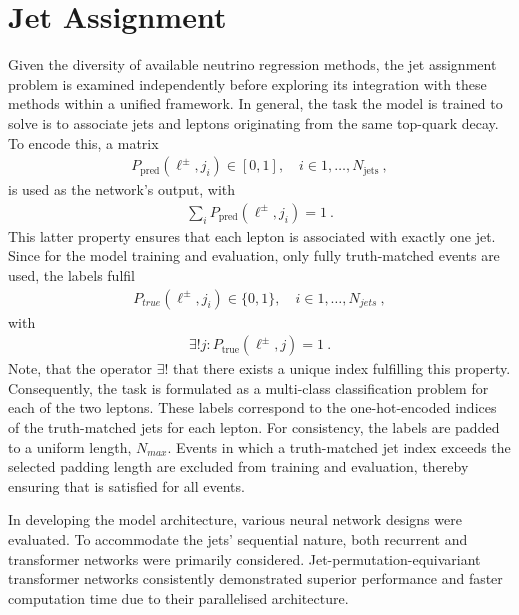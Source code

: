 \section{Jet Assignment}
\label{sec:jet assignment}
Given the diversity of available neutrino regression methods, the jet assignment problem is examined independently before exploring its integration with these methods within a unified framework.
In general, the task the model is trained to solve is to associate jets and leptons originating from the same top-quark decay. To encode this, a matrix 
\begin{align}
    P_{\text{pred}}(\ell^{\pm},j_i)\in[0,1],\quad i\in{1,\ldots, N_{\text{jets}}}~,
\end{align}
is used as the network's output, with
 \begin{align}
    \sum_i P_{\text{pred}}(\ell^{\pm},j_i) = 1~.
\end{align}
This latter property ensures that each lepton is associated with exactly one jet. Since for the model training and evaluation, only fully truth-matched events are used, the labels fulfil \begin{align}
    P_{true}(\ell^{\pm},j_i)\in \{0,1\},\quad i\in{1,\ldots, N_{jets}}~,
\end{align}
with \begin{align}
    \label{eq:label_normalisation}
    \exists ! j: P_{\text{true}}(\ell^{\pm},j) = 1~.
\end{align}
Note, that the operator $\exists !$ that there exists a unique index fulfilling this property.
Consequently, the task is formulated as a multi-class classification problem for each of the two leptons. These labels correspond to the one-hot-encoded indices of the truth-matched jets for each lepton. For consistency, the labels are padded to a uniform length, $N_{max}$. Events in which a truth-matched jet index exceeds the selected padding length are excluded from training and evaluation, thereby ensuring that  is satisfied for all events.

In developing the model architecture, various neural network designs were evaluated. To accommodate the jets' sequential nature, both recurrent and transformer networks were primarily considered. Jet-permutation-equivariant transformer networks consistently demonstrated superior performance and faster computation time due to their parallelised architecture.

